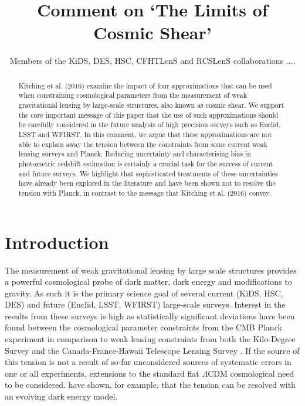 \documentclass[preprint]{aastex}
\begin{document}
\title{\huge{Comment on `The Limits of Cosmic Shear'}}

\author{Members of the KiDS, DES, HSC, CFHTLenS and RCSLenS collaborations ....}


\begin{abstract}
Kitching et al. (2016) examine the impact of four approximations that can be used when constraining cosmological parameters from the measurement of weak gravitational lensing by large-scale structures, also known as cosmic shear.  We support the core important message of this paper that the use of such approximations should be carefully considered in the future analysis of high precision surveys such as Euclid, LSST and WFIRST.  In this comment, we argue that these approximations are not able to explain away the tension between the constraints from some current weak lensing surveys and Planck.  Reducing uncertainty and characterising bias in photometric redshift estimation is certainly a crucial task for the success of current and future surveys.  We highlight that sophisticated treatments of these uncertainties have already been explored in the literature and have been shown not to resolve the tension with Planck, in contrast to the message that Kitching et al. (2016) convey.

\end{abstract}
\section{Introduction}

The measurement of weak gravitational lensing by large scale structures provides a powerful cosmological probe of dark matter, dark energy and modifications to gravity.  As such it is the primary science goal of several current (KiDS, HSC, DES) and future (Euclid, LSST, WFIRST) large-scale surveys.   Interest in the results from these surveys is high as statistically significant deviations have been found between the cosmological parameter constraints from the CMB Planck experiment \citep{planck/cosmo:2015} in comparison to weak lensing constraints from both the Kilo-Degree Survey \citep[KiDS;][]{hildebrandt/etal:2016} and the Canada-France-Hawaii Telescope Lensing Survey \citep[CFHTLenS;][] {joudaki/etal:2016}.  If the source of this tension is not a result of so-far unconsidered sources of systematic errors in one or all experiments, extensions to the standard flat $\Lambda$CDM cosmological need to be considered.  \citet{joudaki/etal:2017} have shown, for example, that the tension can be resolved with an evolving dark energy model.
\end{document}

